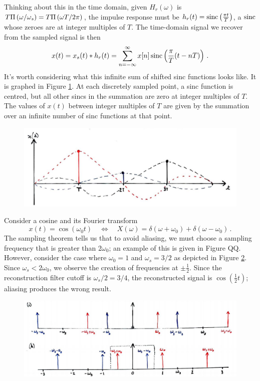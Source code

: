 Thinking about this in the time domain, given $H_r(\omega)$ is
$T\Pi\left(\omega/\omega_s\right) = T\Pi\left(\omega T/2\pi\right)$, the impulse response
must be $h_r(t) = \operatorname{sinc}\left(\frac{\pi t}{T}\right)$, a $\operatorname{sinc}$ whose zeroes
are at integer multiples of $T$. The time-domain signal we recover from the sampled
signal is then
%
\begin{displaymath}
  x(t) = x_s(t)*h_r(t) = \sum_{n=-\infty}^\infty x[n]\operatorname{sinc}\left(\frac{\pi}{T}(t - nT)\right) \,.
\end{displaymath}
%
It's worth considering what this infinite sum of shifted sinc functions looks
like. It is graphed in Figure \ref{fig::lecture_13_sincs}.
At each discretely sampled point, a sinc
function is centred, but all other sincs in the summation are zero at integer
multiples of $T$. The values of $x(t)$ between integer multiples of $T$ are
given by the summation over an infinite number of sinc functions at that point.
%
\begin{figure}[!htb]
  \includegraphics[width=\textwidth]{images/lecture_13_sincs.JPG}
  \caption{
  }
  \label{fig::lecture_13_sincs}
\end{figure}
%
\begin{exmp}
  Consider a cosine and its Fourier transform
  \begin{displaymath}
    x(t) = \cos(\omega_0 t) \quad\Longleftrightarrow\quad
    X(\omega) = \delta(\omega+\omega_0) + \delta(\omega-\omega_0) \,.
  \end{displaymath}
  The sampling theorem tells us that to avoid aliasing, we must choose
  a sampling frequency that is greater than $2\omega_0$; an example of this
  is given in Figure QQ. However, consider the case where $\omega_0=1$ and
  $\omega_s = 3/2$ as depicted in Figure \ref{fig::lecture_13_aliasing_cosine}.
  Since $\omega_s < 2\omega_0$, we observe the creation of frequencies at
  $\pm\frac{1}{2}$. Since the reconstruction filter cutoff is
  $\omega_s/2 = 3/4$, the reconstructed signal is $\cos(\frac{1}{2}t)$; aliasing
  produces the wrong result.
  \begin{figure}[!htb]
    \includegraphics[width=\textwidth]{images/lecture_13_aliasing_cosine.JPG}
    \caption{
    }
    \label{fig::lecture_13_aliasing_cosine}
  \end{figure}
\end{exmp}
